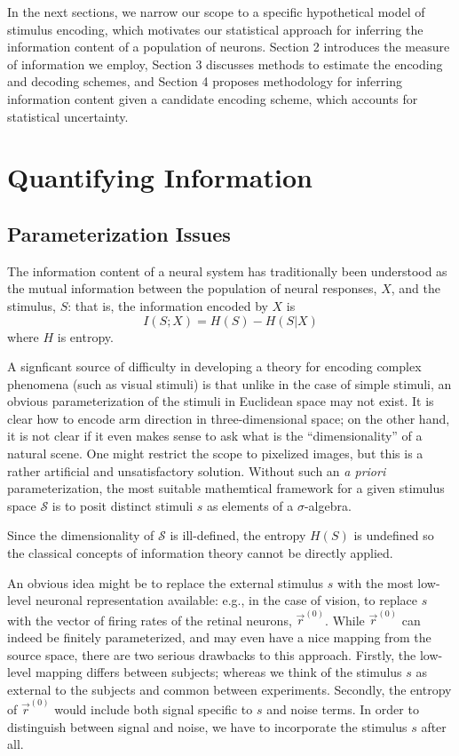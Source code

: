 \documentclass[12pt]{article}
\begin{document}
In the next sections, we narrow our scope to a specific hypothetical
model of stimulus encoding, which motivates our statistical approach
for inferring the information content of a population of neurons.
Section 2 introduces the measure of information we employ, Section 3
discusses methods to estimate the encoding and decoding schemes, and
Section 4 proposes methodology for inferring information content given
a candidate encoding scheme, which accounts for statistical uncertainty.

\section{Quantifying Information}

\subsection{Parameterization Issues}

The information content of a neural system has traditionally been
understood as the mutual information between the population of neural
responses, $X$, and the stimulus, $S$: that is, the information encoded by $X$ is
\[
I(S; X) = H(S) - H(S|X)
\]
where $H$ is entropy.

A signficant source of difficulty in developing a theory for encoding
complex phenomena (such as visual stimuli) is that unlike in the case
of simple stimuli, an obvious parameterization of the stimuli in
Euclidean space may not exist.  It is clear how to encode arm
direction in three-dimensional space; on the other hand, it is not
clear if it even makes sense to ask what is the ``dimensionality'' of
a natural scene.  One might restrict the scope to pixelized images,
but this is a rather artificial and unsatisfactory solution.  Without
such an \emph{a priori} parameterization, the most suitable
mathemtical framework for a given stimulus space $\mathcal{S}$ is to
posit distinct stimuli $s$ as elements of a $\sigma$-algebra.

Since the dimensionality of $\mathcal{S}$ is ill-defined, the entropy
$H(S)$ is undefined so the classical concepts of information theory
cannot be directly applied.

An obvious idea might be to replace the external stimulus $s$ with the
most low-level neuronal representation available: e.g., in the case of
vision, to replace $s$ with the vector of firing rates of the retinal
neurons, $\vec{r}^{(0)}$.  While $\vec{r}^{(0)}$ can indeed be finitely
parameterized, and may even have a nice mapping from the source space,
there are two serious drawbacks to this approach.  Firstly, the
low-level mapping differs between subjects; whereas we think of the
stimulus $s$ as external to the subjects and common between
experiments. Secondly, the entropy of $\vec{r}^{(0)}$ would include both
signal specific to $s$ and noise terms.  In order to distinguish
between signal and noise, we have to incorporate the stimulus $s$
after all.
\end{document}
